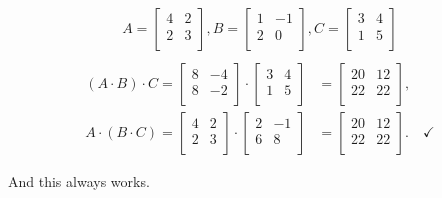 \vspace{-.15in}
\begin{align*}
A =
\begin{bmatrix}
4 & 2 \\
2 & 3 \\
\end{bmatrix},
B =
\begin{bmatrix}
1 & -1 \\
2 & 0 \\
\end{bmatrix},
C =
\begin{bmatrix}
3 & 4 \\
1 & 5 \\
\end{bmatrix}\\
\end{align*}
\vspace{-.55in}
\begin{align*}
(A \cdot B) \cdot C =
\begin{bmatrix}
8 & -4 \\
8 & -2 \\
\end{bmatrix} \cdot
\begin{bmatrix}
3 & 4 \\
1 & 5 \\
\end{bmatrix} &=
\begin{bmatrix}
20 & 12 \\
22 & 22 \\
\end{bmatrix}, \\
A \cdot (B \cdot C) =
\begin{bmatrix}
4 & 2 \\
2 & 3 \\
\end{bmatrix} \cdot
\begin{bmatrix}
2 & -1 \\
6 & 8 \\
\end{bmatrix} &=
\begin{bmatrix}
20 & 12 \\
22 & 22 \\
\end{bmatrix}. \quad \checkmark
\end{align*}
\vspace{-.15in}


And this always works.

